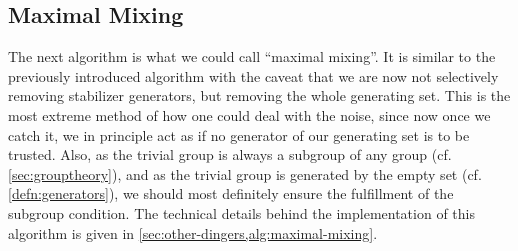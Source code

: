 
\subsection{Maximal Mixing}\label{sec:maximal-mixing}

The next algorithm is what we could call \enquote{maximal mixing}. It is
similar to the previously introduced algorithm with the caveat that we are now
not selectively removing stabilizer generators, but removing the whole
generating set. This is the most extreme method of how one could deal with the
noise, since now once we catch it, we in principle act as if no generator of
our generating set is to be trusted. Also, as the trivial group is always a
subgroup of any group (cf. \cref{sec:grouptheory}), and as the trivial group is
generated by the empty set (cf. \cref{defn:generators}), we should most
definitely ensure the fulfillment of the subgroup condition. The technical
details behind the implementation of this algorithm is given in
\cref{sec:other-dingers,alg:maximal-mixing}.

